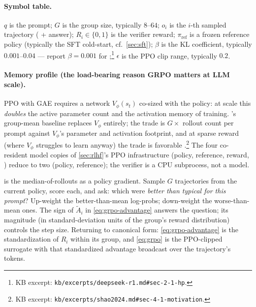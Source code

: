\paragraph{Symbol table.} $q$ is the prompt; $G$ is the group size,
typically $8$--$64$; $o_i$ is the $i$-th sampled trajectory
( + answer); $R_i \in \{0, 1\}$ is the verifier reward;
$\pi_{\mathrm{ref}}$ is a frozen reference policy (typically the SFT
cold-start, cf.\ \cref{sec:sft}); $\beta$ is the KL coefficient,
typically $0.001$--$0.04$ — \citet[\S 2.1]{deepseek-r1} report
$\beta = 0.001$ for ;\footnote{KB excerpt:
\texttt{kb/excerpts/deepseek-r1.md\#sec-2-1-hp}.} $\epsilon$ is the PPO
clip range, typically $0.2$.

\paragraph{Memory profile (the load-bearing reason GRPO matters at LLM
scale).} PPO with GAE \citep[\S 3.5]{ouyang2022-instructgpt} requires a
 network $V_\phi(s_t)$ co-sized with the policy: at  scale this
\emph{doubles} the active parameter count and the activation memory of
training. 's group-mean baseline replaces $V_\phi$ entirely; the
trade is $G \times$ rollout count per prompt against $V_\phi$'s
parameter and activation footprint, and at sparse reward (where $V_\phi$
struggles to learn anyway) the trade is favorable
\citep[\S 4.1]{shao2024}.\footnote{KB excerpt:
\texttt{kb/excerpts/shao2024.md\#sec-4-1-motivation}.} The four
co-resident model copies of \cref{sec:rlhf}'s PPO infrastructure
(policy, reference, reward, ) reduce to two (policy, reference);
the verifier is a CPU subprocess, not a model.

\begin{intuition}
 is the median-of-rollouts as a policy gradient. Sample $G$
trajectories from the current policy, score each, and ask: which were
\emph{better than typical for this prompt}? Up-weight the
better-than-mean log-probs; down-weight the worse-than-mean ones. The
sign of $\tilde{A}_i$ in \cref{eq:grpo-advantage} answers the question;
its magnitude (in standard-deviation units of the group's reward
distribution) controls the step size. Returning to canonical form:
\cref{eq:grpo-advantage} is the standardization of $R_i$ within its
group, and \cref{eq:grpo} is the PPO-clipped surrogate with that
standardized advantage broadcast over the trajectory's tokens.
\end{intuition}

